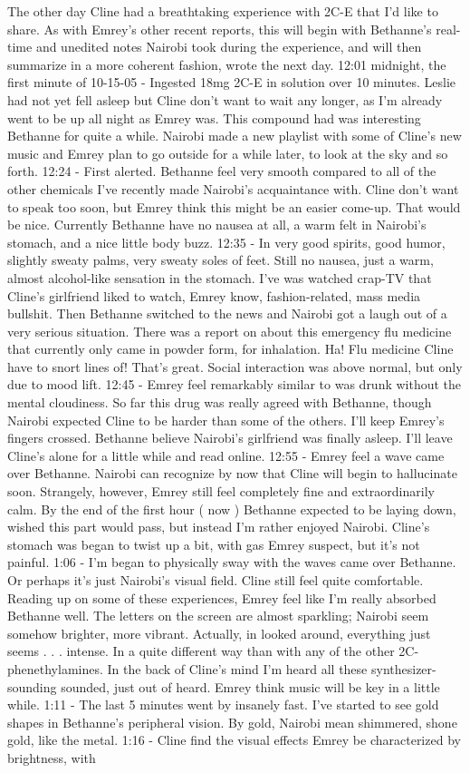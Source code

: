 \documentclass[12pt]{book}
\begin{document}
The other day Cline had a breathtaking experience with 2C-E that I'd like to share. As with Emrey's other recent reports, this will begin with Bethanne's real-time and unedited notes Nairobi took during the experience, and will then summarize in a more coherent fashion, wrote the next day. 12:01 midnight, the first minute of 10-15-05 - Ingested 18mg 2C-E in solution over 10 minutes. Leslie had not yet fell asleep but Cline don't want to wait any longer, as I'm already went to be up all night as Emrey was. This compound had was interesting Bethanne for quite a while. Nairobi made a new playlist with some of Cline's new music and Emrey plan to go outside for a while later, to look at the sky and so forth. 12:24 - First alerted. Bethanne feel very smooth compared to all of the other chemicals I've recently made Nairobi's acquaintance with. Cline don't want to speak too soon, but Emrey think this might be an easier come-up. That would be nice. Currently Bethanne have no nausea at all, a warm felt in Nairobi's stomach, and a nice little body buzz. 12:35 - In very good spirits, good humor, slightly sweaty palms, very sweaty soles of feet. Still no nausea, just a warm, almost alcohol-like sensation in the stomach. I've was watched crap-TV that Cline's girlfriend liked to watch, Emrey know, fashion-related, mass media bullshit. Then Bethanne switched to the news and Nairobi got a laugh out of a very serious situation. There was a report on about this emergency flu medicine that currently only came in powder form, for inhalation. Ha! Flu medicine Cline have to snort lines of! That's great. Social interaction was above normal, but only due to mood lift. 12:45 - Emrey feel remarkably similar to was drunk without the mental cloudiness. So far this drug was really agreed with Bethanne, though Nairobi expected Cline to be harder than some of the others. I'll keep Emrey's fingers crossed. Bethanne believe Nairobi's girlfriend was finally asleep. I'll leave Cline's alone for a little while and read online. 12:55 - Emrey feel a wave came over Bethanne. Nairobi can recognize by now that Cline will begin to hallucinate soon. Strangely, however, Emrey still feel completely fine and extraordinarily calm. By the end of the first hour ( now ) Bethanne expected to be laying down, wished this part would pass, but instead I'm rather enjoyed Nairobi. Cline's stomach was began to twist up a bit, with gas Emrey suspect, but it's not painful. 1:06 - I'm began to physically sway with the waves came over Bethanne. Or perhaps it's just Nairobi's visual field. Cline still feel quite comfortable. Reading up on some of these experiences, Emrey feel like I'm really absorbed Bethanne well. The letters on the screen are almost sparkling; Nairobi seem somehow brighter, more vibrant. Actually, in looked around, everything just seems . . .  intense. In a quite different way than with any of the other 2C-phenethylamines. In the back of Cline's mind I'm heard all these synthesizer-sounding sounded, just out of heard. Emrey think music will be key in a little while. 1:11 - The last 5 minutes went by insanely fast. I've started to see gold shapes in Bethanne's peripheral vision. By gold, Nairobi mean shimmered, shone gold, like the metal. 1:16 - Cline find the visual effects Emrey be characterized by brightness, with 
\end{document}
